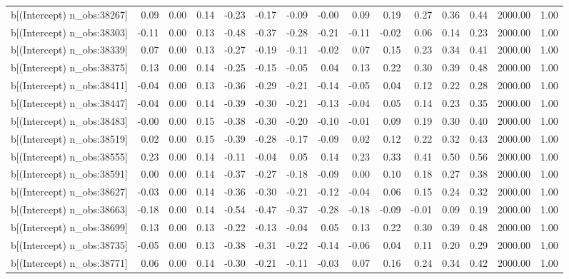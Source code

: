 \begin{table}[ht]
\begin{tabular}{rrrrrrrrrrrrrrr}
  b[(Intercept) n\_obs:38267] & 0.09 & 0.00 & 0.14 & -0.23 & -0.17 & -0.09 & -0.00 & 0.09 & 0.19 & 0.27 & 0.36 & 0.44 & 2000.00 & 1.00 \\ 
  b[(Intercept) n\_obs:38303] & -0.11 & 0.00 & 0.13 & -0.48 & -0.37 & -0.28 & -0.21 & -0.11 & -0.02 & 0.06 & 0.14 & 0.23 & 2000.00 & 1.00 \\ 
  b[(Intercept) n\_obs:38339] & 0.07 & 0.00 & 0.13 & -0.27 & -0.19 & -0.11 & -0.02 & 0.07 & 0.15 & 0.23 & 0.34 & 0.41 & 2000.00 & 1.00 \\ 
  b[(Intercept) n\_obs:38375] & 0.13 & 0.00 & 0.14 & -0.25 & -0.15 & -0.05 & 0.04 & 0.13 & 0.22 & 0.30 & 0.39 & 0.48 & 2000.00 & 1.00 \\ 
  b[(Intercept) n\_obs:38411] & -0.04 & 0.00 & 0.13 & -0.36 & -0.29 & -0.21 & -0.14 & -0.05 & 0.04 & 0.12 & 0.22 & 0.28 & 2000.00 & 1.00 \\ 
  b[(Intercept) n\_obs:38447] & -0.04 & 0.00 & 0.14 & -0.39 & -0.30 & -0.21 & -0.13 & -0.04 & 0.05 & 0.14 & 0.23 & 0.35 & 2000.00 & 1.00 \\ 
  b[(Intercept) n\_obs:38483] & -0.00 & 0.00 & 0.15 & -0.38 & -0.30 & -0.20 & -0.10 & -0.01 & 0.09 & 0.19 & 0.30 & 0.40 & 2000.00 & 1.00 \\ 
  b[(Intercept) n\_obs:38519] & 0.02 & 0.00 & 0.15 & -0.39 & -0.28 & -0.17 & -0.09 & 0.02 & 0.12 & 0.22 & 0.32 & 0.43 & 2000.00 & 1.00 \\ 
  b[(Intercept) n\_obs:38555] & 0.23 & 0.00 & 0.14 & -0.11 & -0.04 & 0.05 & 0.14 & 0.23 & 0.33 & 0.41 & 0.50 & 0.56 & 2000.00 & 1.00 \\ 
  b[(Intercept) n\_obs:38591] & 0.00 & 0.00 & 0.14 & -0.37 & -0.27 & -0.18 & -0.09 & 0.00 & 0.10 & 0.18 & 0.27 & 0.38 & 2000.00 & 1.00 \\ 
  b[(Intercept) n\_obs:38627] & -0.03 & 0.00 & 0.14 & -0.36 & -0.30 & -0.21 & -0.12 & -0.04 & 0.06 & 0.15 & 0.24 & 0.32 & 2000.00 & 1.00 \\ 
  b[(Intercept) n\_obs:38663] & -0.18 & 0.00 & 0.14 & -0.54 & -0.47 & -0.37 & -0.28 & -0.18 & -0.09 & -0.01 & 0.09 & 0.19 & 2000.00 & 1.00 \\ 
  b[(Intercept) n\_obs:38699] & 0.13 & 0.00 & 0.13 & -0.22 & -0.13 & -0.04 & 0.05 & 0.13 & 0.22 & 0.30 & 0.39 & 0.48 & 2000.00 & 1.00 \\ 
  b[(Intercept) n\_obs:38735] & -0.05 & 0.00 & 0.13 & -0.38 & -0.31 & -0.22 & -0.14 & -0.06 & 0.04 & 0.11 & 0.20 & 0.29 & 2000.00 & 1.00 \\ 
  b[(Intercept) n\_obs:38771] & 0.06 & 0.00 & 0.14 & -0.30 & -0.21 & -0.11 & -0.03 & 0.07 & 0.16 & 0.24 & 0.34 & 0.42 & 2000.00 & 1.00 \\ 

\end{tabular}
\end{table}
